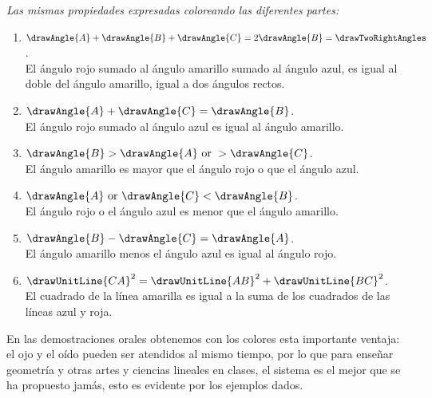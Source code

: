 \documentclass[booklanguage=english]{byrnebook}
\begin{document}
\baselineskip

\begin{center}
\emph{Las mismas propiedades expresadas coloreando las diferentes partes:}
\end{center}

\baselineskip

\begin{enumerate}
\item $\drawAngle{A} + \drawAngle{B} + \drawAngle{C} = 2 \drawAngle{B} = \drawTwoRightAngles$. \\ El ángulo rojo sumado al ángulo amarillo sumado al ángulo azul, es igual al doble del ángulo amarillo, igual a dos ángulos rectos.\\[0.12em]
\item $\drawAngle{A} + \drawAngle{C} = \drawAngle{B}$. \\  El ángulo rojo sumado al ángulo azul es igual al ángulo amarillo.\\[0.12em]
\item $\drawAngle{B} > \drawAngle{A} \mbox{ or } > \drawAngle{C}$. \\ El ángulo amarillo es mayor que el ángulo rojo o que el ángulo azul.\\[0.12em]
\item $\drawAngle{A} \mbox{ or } \drawAngle{C} < \drawAngle{B}$. \\ El ángulo rojo o el ángulo azul es menor que el ángulo amarillo.\\[0.12em]
\item $\drawAngle{B} - \drawAngle{C} = \drawAngle{A}$. \\ El ángulo amarillo menos el ángulo azul es igual al ángulo rojo.\\[0.12em]
\item $\drawUnitLine{CA}^2 = \drawUnitLine{AB}^2 + \drawUnitLine{BC}^2$. \\ El cuadrado de la línea amarilla es igual a la suma de los cuadrados de las líneas azul y roja.
\end{enumerate}

En las demostraciones orales obtenemos con los colores esta importante ventaja: el ojo y el oído pueden ser atendidos al mismo tiempo, por lo que para enseñar geometría y otras artes y ciencias lineales en clases, el sistema es el mejor que se ha propuesto jamás, esto es evidente por los ejemplos dados.

\end{document}

